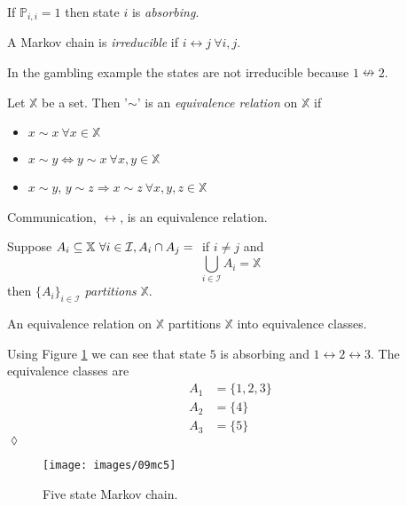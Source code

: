 \begin{definition}
\label{def:absorbing}
If $\mathbb{P}_{i,i}=1$ then state $i$ is \textit{absorbing}.
\end{definition}

\begin{definition}
A Markov chain is \textit{irreducible} if $i\leftrightarrow j ~\forall i,j$.
\end{definition}
In the gambling example the states are not irreducible because $1\nleftrightarrow 2$.

\begin{definition}
Let $\mathbb{X}$ be a set. Then '$\sim$' is an \textit{equivalence relation} on $\mathbb{X}$ if
\begin{itemize}
\item $x\sim x ~\forall x\in\mathbb{X}$
\item $x\sim y \Leftrightarrow y\sim x ~\forall x,y\in\mathbb{X}$
\item $x\sim y$, $y\sim z \Rightarrow x\sim z ~\forall x,y,z\in\mathbb{X}$
\end{itemize}
\end{definition}

\begin{theorem}
Communication, $\leftrightarrow$, is an equivalence relation.
\end{theorem}

\begin{definition}
Suppose $A_i\subseteq \mathbb{X} ~\forall i\in\mathcal{I}, A_i\cap A_j=\null$ if $i\neq j$ and
$$\bigcup_{i\in\mathcal{I}}A_i = \mathbb{X}$$
then $\{A_i\}_{i\in\mathcal{I}}$ \textit{partitions} $\mathbb{X}$.
\end{definition}

\begin{theorem}
An equivalence relation on $\mathbb{X}$ partitions $\mathbb{X}$ into equivalence classes.
\end{theorem}

\begin{example}
Using Figure \ref{fig:09mc5} we can see that state $5$ is absorbing and $1\leftrightarrow 2\leftrightarrow 3$. The equivalence classes are
\begin{align*}
A_1 &= \{1,2,3\} \\
A_2 &= \{4\} \\
A_3 &= \{5\}
\end{align*}
$\lozenge$
\end{example}

\begin{figure}[ht!]
	\centering
	\texttt{[image: images/09mc5]}
	\caption{Five state Markov chain.}
	\label{fig:09mc5}
\end{figure}

